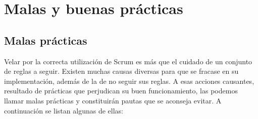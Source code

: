 
\chapter{Malas y buenas prácticas}

\section{Malas prácticas}

Velar por la correcta utilización de Scrum es más que el cuidado de un conjunto de reglas a seguir. Existen muchas causas diversas para que se fracase en su implementación, además de la de no seguir sus reglas. A esas acciones causantes, resultado de prácticas que perjudican su buen funcionamiento, las podemos llamar malas prácticas y constituirán pautas que se aconseja evitar.
A continuación se listan algunas de ellas:

